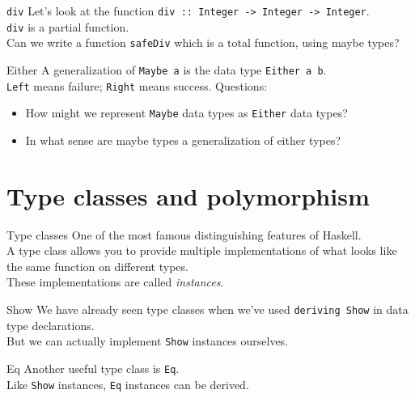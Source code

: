 \documentclass[presentation]{beamer}
\begin{document}
\begin{frame}[label={sec:org881eecf},fragile]{\texttt{div}}
 Let's look at the function \texttt{div :: Integer -> Integer -> Integer}. \\[0pt]
\pause \bigskip
\texttt{div} is a partial function. \\[0pt]
\pause \bigskip
Can we write a function \texttt{safeDiv} which is a total function, using maybe types?
\end{frame}

\begin{frame}[label={sec:orgbd96805},fragile]{Either}
 A generalization of \texttt{Maybe a} is the data type \texttt{Either a b}. \\[0pt]
\pause \bigskip
\texttt{Left} means failure; \texttt{Right} means success.
\pause \bigskip
Questions:
\begin{itemize}
\item How might we represent \texttt{Maybe} data types as \texttt{Either} data types?
\item In what sense are maybe types a generalization of either types?
\end{itemize}
\end{frame}

\section{Type classes and polymorphism}
\label{sec:org31e39e8}
\begin{frame}[label={sec:orgb11dce1}]{Type classes}
One of the most famous distinguishing features of Haskell. \\[0pt]
\pause \bigskip
A type class allows you to provide multiple implementations of what looks
like the same function on different types. \\[0pt]
\pause \bigskip
These implementations are called \emph{instances}.
\end{frame}

\begin{frame}[label={sec:org3fecfa1},fragile]{Show}
 We have already seen type classes when we've used \texttt{deriving Show} in data type
declarations. \\[0pt]
\pause \bigskip
But we can actually implement \texttt{Show} instances ourselves.
\end{frame}

\begin{frame}[label={sec:orgd385b67},fragile]{Eq}
 Another useful type class is \texttt{Eq}. \\[0pt]
\pause \bigskip
Like \texttt{Show} instances, \texttt{Eq} instances can be derived.
\end{frame}
\end{document}
